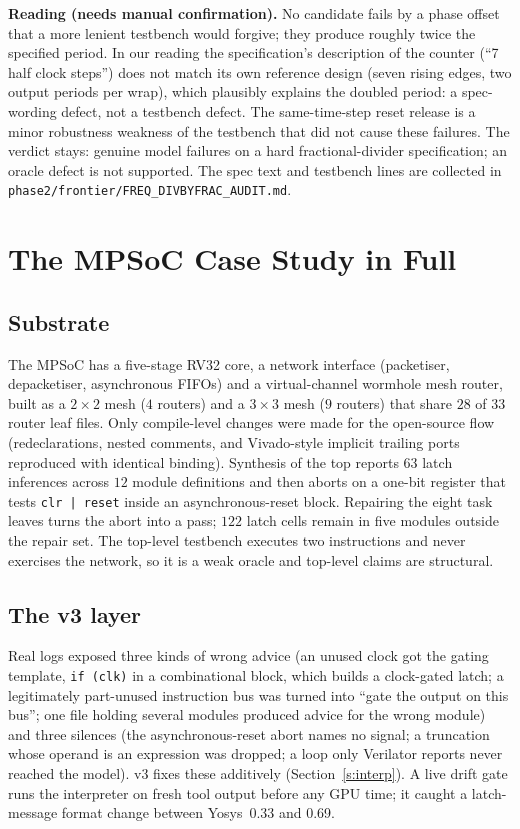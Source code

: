 \documentclass[11pt]{article}
\begin{document}
\textbf{Reading (needs manual confirmation).} No candidate fails by a phase
offset that a more lenient testbench would forgive; they produce roughly twice
the specified period. In our reading the specification's description of the
counter (``7 half clock steps'') does not match its own reference design (seven
rising edges, two output periods per wrap), which plausibly explains the
doubled period: a spec-wording defect, not a testbench defect. The same-time-step
reset release is a minor robustness weakness of the testbench that did not cause
these failures. The verdict stays: genuine model failures on a hard
fractional-divider specification; an oracle defect is not supported. The spec
text and testbench lines are collected in
\texttt{phase2/frontier/FREQ\_DIVBYFRAC\_AUDIT.md}.

\section{The MPSoC Case Study in Full}
\label{s:p3}

\subsection{Substrate}

The MPSoC has a five-stage RV32 core, a network interface (packetiser,
depacketiser, asynchronous FIFOs) and a virtual-channel wormhole mesh router,
built as a $2{\times}2$ mesh ($4$ routers) and a $3{\times}3$ mesh ($9$ routers)
that share $28$ of $33$ router leaf files. Only compile-level changes were made
for the open-source flow (redeclarations, nested comments, and Vivado-style
implicit trailing ports reproduced with identical binding). Synthesis of the top
reports $63$ latch inferences across $12$ module definitions and then aborts on
a one-bit register that tests \texttt{clr | reset} inside an asynchronous-reset
block. Repairing the eight task leaves turns the abort into a pass; $122$ latch
cells remain in five modules outside the repair set. The top-level testbench
executes two instructions and never exercises the network, so it is a weak
oracle and top-level claims are structural.

\subsection{The v3 layer}

Real logs exposed three kinds of wrong advice (an unused clock got the gating
template, \texttt{if (clk)} in a combinational block, which builds a
clock-gated latch; a legitimately part-unused instruction bus was turned into
``gate the output on this bus''; one file holding several modules produced
advice for the wrong module) and three silences (the asynchronous-reset abort
names no signal; a truncation whose operand is an expression was dropped; a loop
only Verilator reports never reached the model). v3 fixes these additively
(Section~\ref{s:interp}). A live drift gate runs the interpreter on fresh tool
output before any GPU time; it caught a latch-message format change between
Yosys~0.33 and 0.69.
\end{document}
